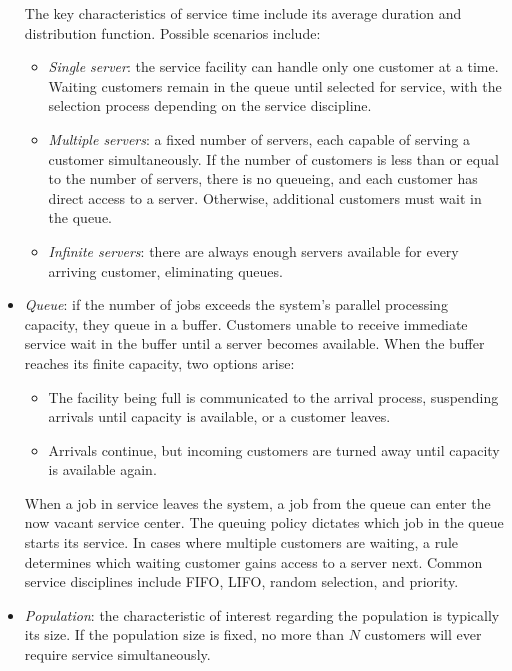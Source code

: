 \begin{itemize}
        The key characteristics of service time include its average duration and distribution function. 
        Possible scenarios include:
        \begin{itemize}
            \item \textit{Single server}: the service facility can handle only one customer at a time.
                Waiting customers remain in the queue until selected for service, with the selection process depending on the service discipline.
            \item \textit{Multiple servers}: a fixed number of servers, each capable of serving a customer simultaneously. 
                If the number of customers is less than or equal to the number of servers, there is no queueing, and each customer has direct access to a server. 
                Otherwise, additional customers must wait in the queue.
            \item \textit{Infinite servers}: there are always enough servers available for every arriving customer, eliminating queues.
        \end{itemize}
    \item \textit{Queue}: if the number of jobs exceeds the system's parallel processing capacity, they queue in a buffer. 
        Customers unable to receive immediate service wait in the buffer until a server becomes available. 
        When the buffer reaches its finite capacity, two options arise:
        \begin{itemize}
            \item The facility being full is communicated to the arrival process, suspending arrivals until capacity is available, or a customer leaves.
            \item Arrivals continue, but incoming customers are turned away until capacity is available again.
        \end{itemize}
        When a job in service leaves the system, a job from the queue can enter the now vacant service center. 
        The queuing policy dictates which job in the queue starts its service. 
        In cases where multiple customers are waiting, a rule determines which waiting customer gains access to a server next. 
        Common service disciplines include FIFO, LIFO, random selection, and priority.
    \item \textit{Population}: the characteristic of interest regarding the population is typically its size.
        If the population size is fixed, no more than $N$ customers will ever require service simultaneously. 

\end{itemize}
